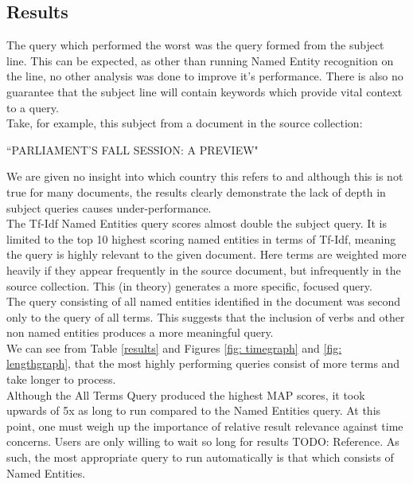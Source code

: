 \documentclass{l4proj}
\begin{document}
\subsection{Results}
The query which performed the worst was the query formed from the subject line. This can be expected, as other than running Named Entity recognition on the line, no other analysis was done to improve it's performance. There is also no guarantee that the subject line will contain keywords which provide vital context to a query.\\
Take, for example, this subject from a document in the source collection:
\begin{center}
``PARLIAMENT'S FALL SESSION: A PREVIEW"
\end{center}
We are given no insight into which country this refers to and although this is not true for many documents, the results clearly demonstrate the lack of depth in subject queries causes under-performance.\\
The Tf-Idf Named Entities query scores almost double the subject query. It is limited to the top 10 highest scoring named entities in terms of Tf-Idf, meaning the query is highly relevant to the given document. Here terms are weighted more heavily if they appear frequently in the source document, but infrequently in the source collection. This (in theory) generates a more specific, focused query. \\
The query consisting of all named entities identified in the document was second only to the query of all terms. This suggests that the inclusion of verbs and other non named entities produces a more meaningful query.\\
We can see from Table \ref{results} and Figures \ref{fig: timegraph} and \ref{fig: lengthgraph}, that the most highly performing queries consist of more terms and take longer to process.\\
Although the All Terms Query produced the highest MAP scores, it took upwards of 5x as long to run compared to the Named Entities query. At this point, one must weigh up the importance of relative result relevance against time concerns. Users are only willing to wait so long for results TODO: Reference. As such, the most appropriate query to run automatically is that which consists of Named Entities.
\end{document}
